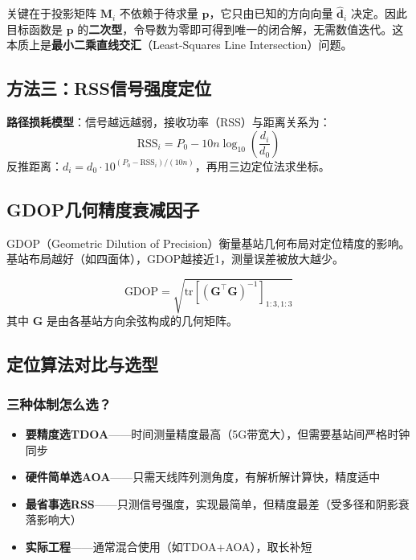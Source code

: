 \documentclass[12pt, a4paper]{article}
\newcommand{\mat}[1]{\boldsymbol{#1}}
\begin{document}
\begin{intubox}[为什么能直接求解？]
关键在于投影矩阵 $\mat{M}_i$ 不依赖于待求量 $\mat{p}$，它只由已知的方向向量 $\hat{\mat{d}}_i$ 决定。因此目标函数是 $\mat{p}$ 的\textbf{二次型}，令导数为零即可得到唯一的闭合解，无需数值迭代。这本质上是\textbf{最小二乘直线交汇}（Least-Squares Line Intersection）问题。
\end{intubox}

\subsection{方法三：RSS信号强度定位}

\textbf{路径损耗模型}：信号越远越弱，接收功率（RSS）与距离关系为：
\begin{equation}
\text{RSS}_i = P_0 - 10n\log_{10}\!\left(\frac{d_i}{d_0}\right)
\end{equation}
反推距离：$d_i = d_0 \cdot 10^{(P_0 - \text{RSS}_i)/(10n)}$，再用三边定位法求坐标。

\subsection{GDOP几何精度衰减因子}

GDOP（Geometric Dilution of Precision）衡量基站几何布局对定位精度的影响。基站布局越好（如四面体），GDOP越接近1，测量误差被放大越少。

\begin{equation}
\text{GDOP} = \sqrt{\text{tr}\left[(\mat{G}^\top\mat{G})^{-1}\right]_{1:3,1:3}}
\end{equation}
其中 $\mat{G}$ 是由各基站方向余弦构成的几何矩阵。

\subsection{定位算法对比与选型}

\subsubsection{三种体制怎么选？}

\begin{intubox}[一句话总结]
\begin{itemize}
  \item \textbf{要精度选TDOA}——时间测量精度最高（5G带宽大），但需要基站间严格时钟同步
  \item \textbf{硬件简单选AOA}——只需天线阵列测角度，有解析解计算快，精度适中
  \item \textbf{最省事选RSS}——只测信号强度，实现最简单，但精度最差（受多径和阴影衰落影响大）
  \item \textbf{实际工程}——通常混合使用（如TDOA+AOA），取长补短
\end{itemize}
\end{intubox}
\end{document}
